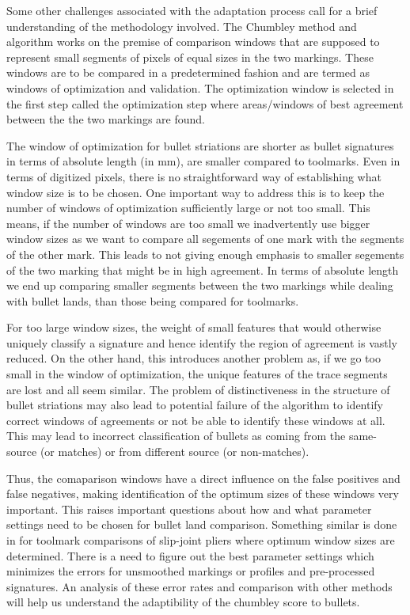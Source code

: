 \documentclass[12pt]{article}
\begin{document}
Some other challenges associated with the adaptation process call for a
brief understanding of the methodology involved. The Chumbley method and
algorithm works on the premise of comparison windows that are supposed
to represent small segments of pixels of equal sizes in the two
markings. These windows are to be compared in a predetermined fashion
and are termed as windows of optimization and validation. The
optimization window is selected in the first step called the
optimization step where areas/windows of best agreement between the the
two markings are found.

The window of optimization for bullet striations are shorter as bullet
signatures in terms of absolute length (in mm), are smaller compared to
toolmarks. Even in terms of digitized pixels, there is no
straightforward way of establishing what window size is to be chosen.
One important way to address this is to keep the number of windows of
optimization sufficiently large or not too small. This means, if the
number of windows are too small we inadvertently use bigger window sizes
as we want to compare all segements of one mark with the segments of the
other mark. This leads to not giving enough emphasis to smaller
segements of the two marking that might be in high agreement. In terms
of absolute length we end up comparing smaller segments between the two
markings while dealing with bullet lands, than those being compared for
toolmarks.

For too large window sizes, the weight of small features that would
otherwise uniquely classify a signature and hence identify the region of
agreement is vastly reduced. On the other hand, this introduces another
problem as, if we go too small in the window of optimization, the unique
features of the trace segments are lost and all seem similar. The
problem of distinctiveness in the structure of bullet striations may
also lead to potential failure of the algorithm to identify correct
windows of agreements or not be able to identify these windows at all.
This may lead to incorrect classification of bullets as coming from the
same-source (or matches) or from different source (or non-matches).

Thus, the comaparison windows have a direct influence on the false
positives and false negatives, making identification of the optimum
sizes of these windows very important. This raises important questions
about how and what parameter settings need to be chosen for bullet land
comparison. Something similar is done in \citet{afte-chumbley} for
toolmark comparisons of slip-joint pliers where optimum window sizes are
determined. There is a need to figure out the best parameter settings
which minimizes the errors for unsmoothed markings or profiles and
pre-processed signatures. An analysis of these error rates and
comparison with other methods will help us understand the adaptibility
of the chumbley score to bullets.
\end{document}
